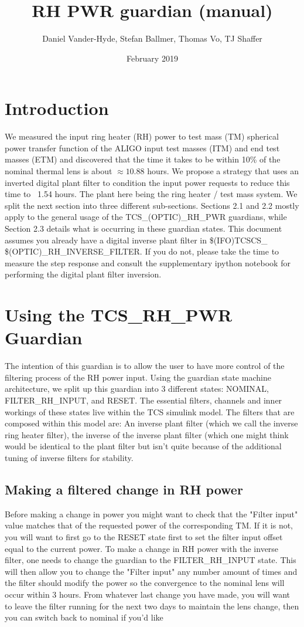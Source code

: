 \documentclass{article}
\title{RH PWR guardian (manual)}
\author{Daniel Vander-Hyde, Stefan Ballmer, Thomas Vo, TJ Shaffer}
\date{February 2019}
\begin{document}
\maketitle

\section{Introduction}
We measured the input ring heater (RH) power to test mass (TM) spherical power transfer function of the ALIGO input test masses (ITM) and end test masses (ETM) and discovered that the time it takes to be within 10\% of the nominal thermal lens is about $\approx 10.88$ hours. We propose a strategy that uses an inverted digital plant filter to condition the input power requests to reduce this time to ~1.54 hours. The plant here being the ring heater / test mass system. We split the next section into three different sub-sections. Sections 2.1 and 2.2 mostly apply to the general usage of the TCS\_(OPTIC)\_RH\_PWR guardians, while Section 2.3 details what is occurring in these guardian states. This document assumes you already have a digital inverse plant filter in \$(IFO)TCSCS\_ \$(OPTIC)\_RH\_INVERSE\_FILTER. If you do not, please take the time to measure the step response and consult the supplementary ipython notebook for performing the digital plant filter inversion. 

\section{Using the TCS\_RH\_PWR Guardian}
The intention of this guardian is to allow the user to have more control of the filtering process of the RH power input. Using the guardian state machine architecture, we split up this guardian into 3 different states: NOMINAL, FILTER\_RH\_INPUT, and RESET. The essential filters, channels and inner workings of these states live within the TCS simulink model. The filters that are composed within this model are: An inverse plant filter (which we call the inverse ring heater filter), the inverse of the inverse plant filter (which one might think would be identical to the plant filter but isn't quite because of the additional tuning of inverse filters for stability.

\subsection{Making a filtered change in RH power}
Before making a change in power you might want to check that the "Filter input" value matches that of the requested power of the corresponding TM. If it is not, you will want to first go to the RESET state first to set the filter input offset equal to the current power.  
To make a change in RH power with the inverse filter, one needs to change the guardian to the FILTER\_RH\_INPUT state. This will then allow you to change the "Filter input" any number amount of times and the filter should modify the power so the convergence to the nominal lens will occur within 3 hours. From whatever last change you have made, you will want to leave the filter running for the next two days to maintain the lens change, then you can switch back to nominal if you'd like
\end{document}
